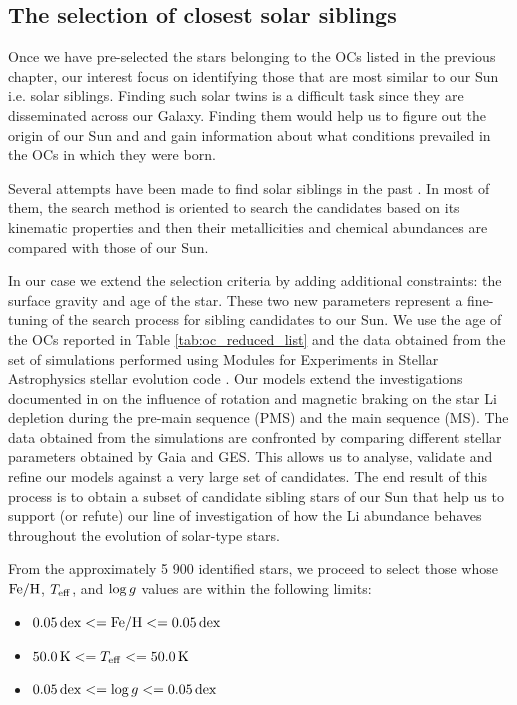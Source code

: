 \documentclass[fleqn,usenatbib]{mnras}
\begin{document}
\subsection{The selection of closest solar siblings}
Once we have pre-selected the stars belonging to the OCs listed in the previous chapter, our interest focus on identifying those that are most similar to our Sun i.e. solar siblings. Finding such solar twins is a difficult task since they are disseminated across our Galaxy. Finding them would help us to figure out the origin of our Sun and and gain information about what conditions prevailed in the OCs in which they were born.\par

Several attempts have been made to find solar siblings in the past \citep[see][and references therein]{Adibekyan2018}. In most of them, the search method is oriented to search the candidates based on its kinematic properties and then their metallicities and chemical abundances are compared with those of our Sun.\par

In our case we extend the selection criteria by adding additional constraints: the surface gravity and age of the star. These two new parameters represent a fine-tuning of the search process for sibling candidates to our Sun. We use the age of the OCs reported in Table \ref{tab:oc_reduced_list} and the data obtained from the set of simulations performed using Modules for Experiments in Stellar Astrophysics stellar evolution code \citep[MESA; ][]{Paxton2011, Paxton2013,Paxton2015, Paxton2018, Paxton2019}. Our models extend the investigations documented in \cite{Navarro2020} on the influence of rotation and magnetic braking on the star Li depletion during the pre-main sequence (PMS) and the main sequence (MS). The data obtained from the simulations are confronted by comparing different stellar parameters obtained by Gaia and GES. This allows us to analyse, validate and refine our models against a very large set of candidates. The end result of this process is to obtain a subset of candidate sibling stars of our Sun that help us to support (or refute) our line of investigation of how the Li abundance behaves throughout the evolution of solar-type stars.\par


From the approximately 5 900 identified stars, we proceed to select those whose $\mathrm{Fe}/\mathrm{H}$, $T_{\mathrm{eff}}$, and $\mathrm{log} \, g$ values are within the following limits:
\begin{itemize}
    \item $0.05 \, \mathrm{dex} <= \mathrm{Fe}/\mathrm{H} <= 0.05 \, \mathrm{dex}$
    \item $50.0 \, \mathrm{K} <= T_{\mathrm{eff}} <= 50.0 \, \mathrm{K}$
    \item $0.05 \, \mathrm{dex} <= \mathrm{log} \, g <= 0.05 \, \mathrm{dex}$
\end{itemize}
\end{document}
